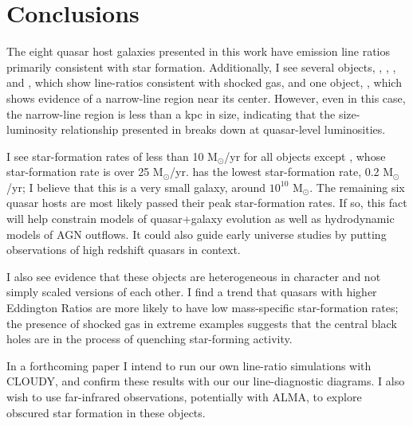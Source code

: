 \section{Conclusions}

The eight quasar host galaxies presented in this work have emission line ratios primarily consistent with star formation.  Additionally, I see several objects, , , , and , which show line-ratios consistent with shocked gas, and one object, , which shows evidence of a narrow-line region near its center.  However, even in this case, the narrow-line region is less than a kpc in size, indicating that the size-luminosity relationship presented in \cite{Bennert} breaks down at quasar-level luminosities.

I see star-formation rates of less than 10 M$_\odot$/yr for all objects except , whose star-formation rate is over 25 M$_\odot$/yr.   has the lowest star-formation rate, 0.2 M$_\odot$/yr; I believe that this is a very small galaxy, around $10^{10}$ M$_\odot$.  The remaining six quasar hosts are most likely passed their peak star-formation rates. If so, this fact will help constrain models of quasar+galaxy evolution as well as hydrodynamic models of AGN outflows. It could also guide early universe studies by putting observations of high redshift quasars in context.

I also see evidence that these objects are heterogeneous in character and not simply scaled versions of each other.  I find a trend that quasars with higher Eddington Ratios are more likely to have low mass-specific star-formation rates; the presence of shocked gas in extreme examples suggests that the central black holes are in the process of quenching star-forming activity.

In a forthcoming paper I intend to run our own line-ratio simulations with CLOUDY, and confirm these results with our our line-diagnostic diagrams.  I also wish to use far-infrared observations, potentially with ALMA, to explore obscured star formation in these objects.
\clearpage  

